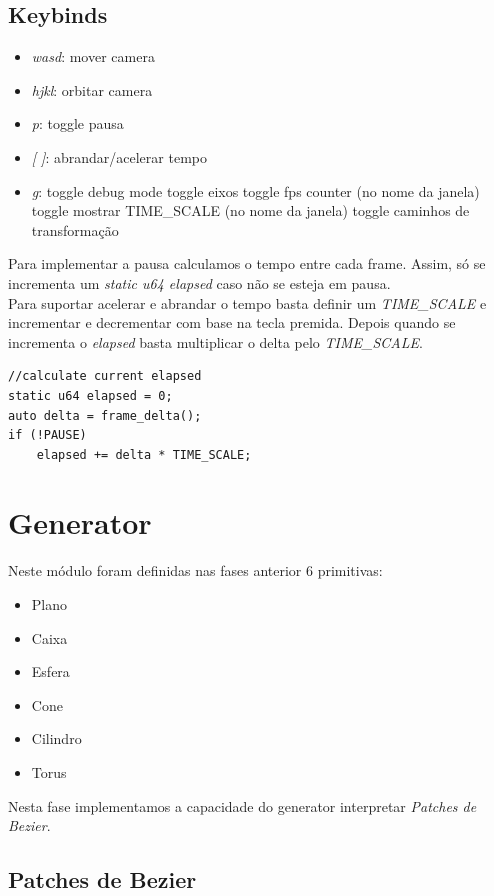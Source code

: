 \documentclass[a4paper]{report}
\begin{document}
\section{Keybinds}
\begin{itemize}
    \item \textit{wasd}: mover camera
    \item \textit{hjkl}: orbitar camera
    \item \textit{p}: toggle pausa
    \item \textit{[ ]}: abrandar/acelerar tempo
    \item \textit{g}: toggle debug mode
        \subitem toggle eixos
        \subitem toggle fps counter (no nome da janela)
        \subitem toggle mostrar TIME\_SCALE (no nome da janela)
        \subitem toggle caminhos de transformação
\end{itemize}
Para implementar a pausa calculamos o tempo entre cada frame. Assim, só se
incrementa um \textit{static u64 elapsed} caso não se esteja em pausa.\\
Para suportar acelerar e abrandar o tempo basta definir um \textit{TIME\_SCALE}
e incrementar e decrementar com base na tecla premida. Depois quando se
incrementa o \textit{elapsed} basta multiplicar o delta pelo
\textit{TIME\_SCALE}.\\

\begin{lstlisting}
//calculate current elapsed
static u64 elapsed = 0;
auto delta = frame_delta();
if (!PAUSE)
    elapsed += delta * TIME_SCALE;
\end{lstlisting}

\chapter{Generator}
Neste módulo foram definidas nas fases anterior 6 primitivas:
\begin{itemize}
        \item Plano
        \item Caixa
        \item Esfera
        \item Cone
        \item Cilindro
        \item Torus
\end{itemize}
Nesta fase implementamos a capacidade do generator interpretar \textit{Patches
de Bezier}.

\section{Patches de Bezier}
\end{document}

